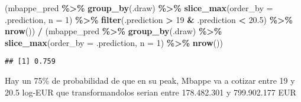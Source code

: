 \documentclass[
]{article}
\newenvironment{Shaded}{\begin{snugshade}}{\end{snugshade}}
\newcommand{\AttributeTok}[1]{\textcolor[rgb]{0.13,0.29,0.53}{#1}}
\newcommand{\DecValTok}[1]{\textcolor[rgb]{0.00,0.00,0.81}{#1}}
\newcommand{\FloatTok}[1]{\textcolor[rgb]{0.00,0.00,0.81}{#1}}
\newcommand{\FunctionTok}[1]{\textcolor[rgb]{0.13,0.29,0.53}{\textbf{#1}}}
\newcommand{\NormalTok}[1]{#1}
\newcommand{\SpecialCharTok}[1]{\textcolor[rgb]{0.81,0.36,0.00}{\textbf{#1}}}
\begin{document}
\begin{Shaded}
\begin{Highlighting}[]
\NormalTok{(mbappe\_pred }\SpecialCharTok{\%\textgreater{}\%}
  \FunctionTok{group\_by}\NormalTok{(.draw) }\SpecialCharTok{\%\textgreater{}\%}
  \FunctionTok{slice\_max}\NormalTok{(}\AttributeTok{order\_by =}\NormalTok{ .prediction, }\AttributeTok{n =} \DecValTok{1}\NormalTok{) }\SpecialCharTok{\%\textgreater{}\%}
  \FunctionTok{filter}\NormalTok{(.prediction }\SpecialCharTok{\textgreater{}} \DecValTok{19} \SpecialCharTok{\&}\NormalTok{ .prediction }\SpecialCharTok{\textless{}} \FloatTok{20.5}\NormalTok{) }\SpecialCharTok{\%\textgreater{}\%}
  \FunctionTok{nrow}\NormalTok{()) }\SpecialCharTok{/} 
\NormalTok{  (mbappe\_pred }\SpecialCharTok{\%\textgreater{}\%}
  \FunctionTok{group\_by}\NormalTok{(.draw) }\SpecialCharTok{\%\textgreater{}\%}
  \FunctionTok{slice\_max}\NormalTok{(}\AttributeTok{order\_by =}\NormalTok{ .prediction, }\AttributeTok{n =} \DecValTok{1}\NormalTok{) }\SpecialCharTok{\%\textgreater{}\%}
  \FunctionTok{nrow}\NormalTok{())}
\end{Highlighting}
\end{Shaded}

\begin{verbatim}
## [1] 0.759
\end{verbatim}

Hay un 75\% de probabilidad de que en su peak, Mbappe va a cotizar entre
19 y 20.5 log-EUR que transformandolos serian entre 178.482.301 y
799.902.177 EUR
\end{document}
